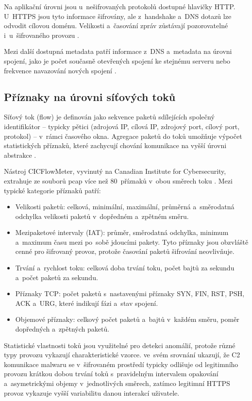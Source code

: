 Na aplikační úrovni jsou u~nešifrovaných protokolů dostupné hlavičky HTTP. U~HTTPS jsou tyto informace šifrovány, ale z~handshake a~DNS dotazů lze odvodit cílovou doménu. Velikosti a~časování zpráv zůstávají pozorovatelné i~u~šifrovaného provozu \parencite{Barut2020}.

Mezi další dostupná metadata patří informace z~DNS a~metadata na úrovni spojení, jako je počet současně otevřených spojení ke stejnému serveru nebo frekvence navazování nových spojení \parencite{OzkanOkay2021}.

\subsection{Příznaky na úrovni síťových toků}
\label{sec:charakteristiky-toku}

Síťový tok (flow) je definován jako sekvence paketů sdílejících společný identifikátor -- typicky pětici (zdrojová IP, cílová IP, zdrojový port, cílový port, protokol) -- v~rámci časového okna. Agregace paketů do toků umožňuje výpočet statistických příznaků, které zachycují chování komunikace na vyšší úrovni abstrakce \parencite{Ji2024}.

Nástroj CICFlowMeter, vyvinutý na Canadian Institute for Cybersecurity, extrahuje ze souborů pcap více než 80~příznaků v~obou směrech toku \parencite{Sharafaldin2018}. Mezi typické kategorie příznaků patří:

\begin{itemize}
\item Velikosti paketů: celková, minimální, maximální, průměrná a~směrodatná odchylka velikosti paketů v~dopředném a~zpětném směru.
\item Mezipaketové intervaly (IAT): průměr, směrodatná odchylka, minimum a~maximum času mezi po~sobě jdoucími pakety. Tyto příznaky jsou obzvláště cenné pro šifrovaný provoz, protože časování paketů šifrování neovlivňuje.
\item Trvání a~rychlost toku: celková doba trvání toku, počet bajtů za sekundu a~počet paketů za sekundu.
\item Příznaky TCP: počet paketů s~nastavenými příznaky SYN, FIN, RST, PSH, ACK a~URG, které indikují fázi a~stav spojení.
\item Objemové příznaky: celkový počet paketů a~bajtů v~každém směru, poměr dopředných a~zpětných paketů.
\end{itemize}

Statistické vlastnosti toků jsou využitelné pro detekci anomálií, protože různé typy provozu vykazují charakteristické vzorce. \textcite{Barut2020} ve~svém srovnání ukazují, že C2 komunikace malwaru se v~šifrovaném prostředí typicky odlišuje od legitimního provozu krátkou dobou trvání toků s~pravidelným intervalem opakování a~asymetrickými objemy v~jednotlivých směrech, zatímco legitimní HTTPS provoz vykazuje vyšší variabilitu danou interakcí uživatele.

